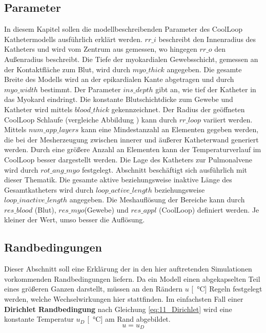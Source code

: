 \subsection*{Parameter}
\label{sec:Parameter}
In diesem Kapitel sollen die modellbeschreibenden Parameter des CoolLoop\SymbReg{} Kathetermodells ausführlich erklärt werden.
\textbf{$rr\_i$} beschreibt den Innenradius des Katheters und wird vom Zentrum aus gemessen, wo hingegen \textbf{$rr\_o$} den Außenradius beschreibt. Die Tiefe der myokardialen Gewebsschicht, gemessen an der Kontaktfläche zum Blut, wird durch \textbf{$myo\_thick$} angegeben. Die gesamte Breite des Modells wird an der epikardialen Kante abgetragen und durch \textbf{$myo\_width$} bestimmt. Der Parameter \textbf{$ins\_depth$} gibt an, wie tief der Katheter in das Myokard eindringt. Die konstante Blutschichtdicke zum Gewebe und Katheter wird mittels $blood\_thick$ gekennzeichnet. Der Radius der geöffneten CoolLoop\SymbReg{} Schlaufe (vergleiche Abbildung ) kann durch \textbf{$rr\_loop$} variiert werden. Mittels $num\_app\_layers$ kann eine Mindestanzahl an Elementen gegeben werden, die bei der Mesherzeugung zwischen innerer und äußerer Katheterwand generiert werden. Durch eine größere Anzahl an Elementen kann der Temperaturverlauf im CoolLoop\SymbReg{} besser dargestellt werden. Die Lage des Katheters zur Pulmonalvene wird durch \textbf{$rot\_ang\_myo$} festgelegt. Abschnitt beschäftigt sich ausführlich mit dieser Thematik. Die gesamte aktive beziehungsweise inaktive Länge des Gesamtkatheters wird durch \textbf{$loop\_active\_length$} beziehungsweise \textbf{$loop\_inactive\_length$} angegeben. Die Meshauflösung der Bereiche kann durch \textbf{$res\_blood$} (Blut), \textbf{$res\_myo$}(Gewebe) und \textbf{$res\_appl$} (CoolLoop\SymbReg) definiert werden. Je kleiner der Wert, umso besser die Auflösung.

\newpage
\subsection*{Randbedingungen}
\label{sec:Randbedingungen}
Dieser Abschnitt soll eine Erklärung der in den hier auftretenden Simulationen vorkommenden Randbedingungen liefern. Da ein Modell einen abgekapselten Teil eines größeren Ganzen darstellt, müssen an den Rändern $u$ [\SI{}{\celsius}] Regeln festgelegt werden, welche Wechselwirkungen hier stattfinden. Im einfachsten Fall einer \textbf{Dirichlet Randbedingung} nach Gleichung \ref{eq:11_Dirichlet} wird eine konstante Temperatur $u_D$ [\SI{}{\celsius}] am Rand abgebildet.
\begin{equation}
\label{eq:11_Dirichlet}
u = u_D
\end{equation}


